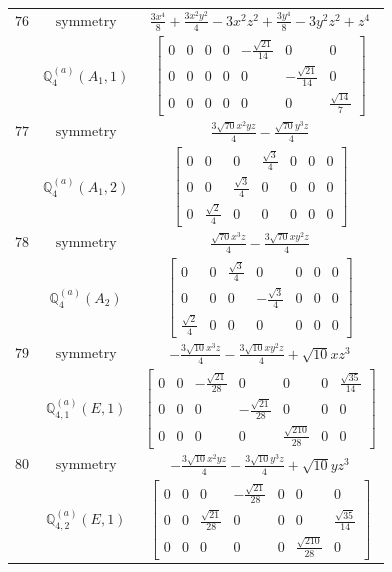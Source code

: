 \documentclass[fleqn,8pt,landscape]{jsarticle}
\begin{document}
\begin{longtable}{ccc}
$ 76 $ & $ \text{symmetry} $ & $ \frac{3 x^{4}}{8} + \frac{3 x^{2} y^{2}}{4} - 3 x^{2} z^{2} + \frac{3 y^{4}}{8} - 3 y^{2} z^{2} + z^{4} $ \\
$  $ & $ \mathbb{Q}_{4}^{(a)}(A_{1},1) $ & $ \begin{bmatrix} 0 & 0 & 0 & 0 & - \frac{\sqrt{21}}{14} & 0 & 0 \\ 0 & 0 & 0 & 0 & 0 & - \frac{\sqrt{21}}{14} & 0 \\ 0 & 0 & 0 & 0 & 0 & 0 & \frac{\sqrt{14}}{7} \end{bmatrix} $ \\ \hline
$ 77 $ & $ \text{symmetry} $ & $ \frac{3 \sqrt{70} x^{2} y z}{4} - \frac{\sqrt{70} y^{3} z}{4} $ \\
$  $ & $ \mathbb{Q}_{4}^{(a)}(A_{1},2) $ & $ \begin{bmatrix} 0 & 0 & 0 & \frac{\sqrt{3}}{4} & 0 & 0 & 0 \\ 0 & 0 & \frac{\sqrt{3}}{4} & 0 & 0 & 0 & 0 \\ 0 & \frac{\sqrt{2}}{4} & 0 & 0 & 0 & 0 & 0 \end{bmatrix} $ \\ \hline
$ 78 $ & $ \text{symmetry} $ & $ \frac{\sqrt{70} x^{3} z}{4} - \frac{3 \sqrt{70} x y^{2} z}{4} $ \\
$  $ & $ \mathbb{Q}_{4}^{(a)}(A_{2}) $ & $ \begin{bmatrix} 0 & 0 & \frac{\sqrt{3}}{4} & 0 & 0 & 0 & 0 \\ 0 & 0 & 0 & - \frac{\sqrt{3}}{4} & 0 & 0 & 0 \\ \frac{\sqrt{2}}{4} & 0 & 0 & 0 & 0 & 0 & 0 \end{bmatrix} $ \\ \hline
$ 79 $ & $ \text{symmetry} $ & $ - \frac{3 \sqrt{10} x^{3} z}{4} - \frac{3 \sqrt{10} x y^{2} z}{4} + \sqrt{10} x z^{3} $ \\
$  $ & $ \mathbb{Q}_{4,1}^{(a)}(E,1) $ & $ \begin{bmatrix} 0 & 0 & - \frac{\sqrt{21}}{28} & 0 & 0 & 0 & \frac{\sqrt{35}}{14} \\ 0 & 0 & 0 & - \frac{\sqrt{21}}{28} & 0 & 0 & 0 \\ 0 & 0 & 0 & 0 & \frac{\sqrt{210}}{28} & 0 & 0 \end{bmatrix} $ \\ \hline
$ 80 $ & $ \text{symmetry} $ & $ - \frac{3 \sqrt{10} x^{2} y z}{4} - \frac{3 \sqrt{10} y^{3} z}{4} + \sqrt{10} y z^{3} $ \\
$  $ & $ \mathbb{Q}_{4,2}^{(a)}(E,1) $ & $ \begin{bmatrix} 0 & 0 & 0 & - \frac{\sqrt{21}}{28} & 0 & 0 & 0 \\ 0 & 0 & \frac{\sqrt{21}}{28} & 0 & 0 & 0 & \frac{\sqrt{35}}{14} \\ 0 & 0 & 0 & 0 & 0 & \frac{\sqrt{210}}{28} & 0 \end{bmatrix} $ \\ \hline

\end{longtable}
\end{document}
